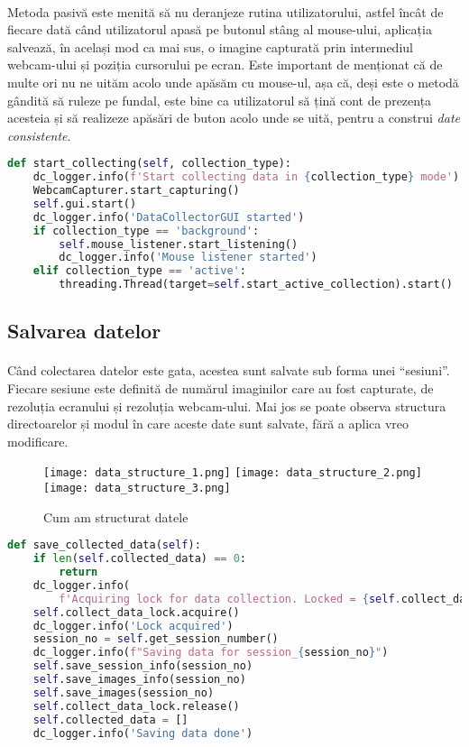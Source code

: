 \paragraph{}
Metoda pasivă este menită să nu deranjeze rutina utilizatorului, astfel încât de fiecare dată când utilizatorul apasă pe butonul stâng al mouse-ului, aplicația salvează, în același mod ca mai sus, o imagine capturată prin intermediul webcam-ului și poziția cursorului pe ecran.
Este important de menționat că de multe ori nu ne uităm acolo unde apăsăm cu mouse-ul, așa că, deși este o metodă gândită să ruleze pe fundal, este bine ca utilizatorul să țină cont de prezența acesteia și să realizeze apăsări de buton acolo unde se uită, pentru a construi \emph{date consistente}.


\begin{lstlisting}[language=Python, caption=Colectarea datelor]
def start_collecting(self, collection_type):
    dc_logger.info(f'Start collecting data in {collection_type} mode')
    WebcamCapturer.start_capturing()
    self.gui.start()
    dc_logger.info('DataCollectorGUI started')
    if collection_type == 'background':
        self.mouse_listener.start_listening()
        dc_logger.info('Mouse listener started')
    elif collection_type == 'active':
        threading.Thread(target=self.start_active_collection).start()
\end{lstlisting}

\subsection{Salvarea datelor}
\paragraph{}
Când colectarea datelor este gata, acestea sunt salvate sub forma unei ``sesiuni''.
Fiecare sesiune este definită de numărul imaginilor care au fost capturate, de rezoluția ecranului și rezoluția webcam-ului.
Mai jos se poate observa structura directoarelor și modul în care aceste date sunt salvate, fără a aplica vreo modificare.

\begin{figure}[h]
    \centering
    \texttt{[image: data\_structure\_1.png]}
    \texttt{[image: data\_structure\_2.png]}
    \texttt{[image: data\_structure\_3.png]}
    \caption{Cum am structurat datele}
\end{figure}

\begin{lstlisting}[language=Python, caption=Salvarea datelor]
def save_collected_data(self):
    if len(self.collected_data) == 0:
        return
    dc_logger.info(
        f'Acquiring lock for data collection. Locked = {self.collect_data_lock.locked()}')
    self.collect_data_lock.acquire()
    dc_logger.info('Lock acquired')
    session_no = self.get_session_number()
    dc_logger.info(f"Saving data for session_{session_no}")
    self.save_session_info(session_no)
    self.save_images_info(session_no)
    self.save_images(session_no)
    self.collect_data_lock.release()
    self.collected_data = []
    dc_logger.info('Saving data done')
\end{lstlisting}

